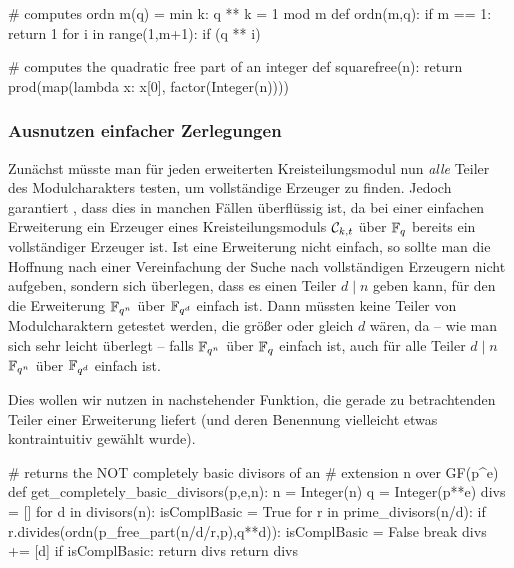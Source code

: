 \begin{sagecode}[caption={Aus \url{../Sage/enumeratePCNs.spyx}},
  firstnumber=538]
# computes ordn m(q) = min{ k: q ** k = 1 mod m }
def ordn(m,q):
    if m == 1: return 1
    for i in range(1,m+1):
        if (q ** i)%
\end{sagecode}  

\begin{sagecode}[caption={Aus \url{../Sage/enumeratePCNs.spyx}},
  firstnumber=534]
# computes the quadratic free part of an integer
def squarefree(n):
    return prod(map(lambda x: x[0], factor(Integer(n))))
\end{sagecode}  


\subsubsection{Ausnutzen einfacher Zerlegungen}

Zunächst müsste man für jeden erweiterten Kreisteilungsmodul
nun \emph{alle} Teiler des Modulcharakters testen, um vollständige Erzeuger zu
finden. Jedoch garantiert , dass dies in
manchen Fällen überflüssig ist, da bei einer einfachen Erweiterung ein Erzeuger
eines Kreisteilungsmoduls $\mathcal{C}_{k,t}$ über $\mathbb{F}_q$ bereits ein vollständiger
Erzeuger ist. Ist eine Erweiterung nicht einfach, so sollte man die Hoffnung
nach einer Vereinfachung der Suche nach vollständigen Erzeugern nicht aufgeben,
sondern sich überlegen, dass es einen Teiler $d \mid n$ geben kann, für den
die Erweiterung $\mathbb{F}_{q^n}$ über $\mathbb{F}_{q^d}$ einfach ist. Dann müssten keine
Teiler von Modulcharaktern getestet werden, die größer oder gleich $d$ wären, 
da -- wie man sich sehr leicht überlegt -- falls $\mathbb{F}_{q^n}$ über $\mathbb{F}_q$ einfach
ist, auch für alle Teiler $d\mid n$ $\mathbb{F}_{q^n}$ über $\mathbb{F}_{q^d}$ einfach ist.

Dies wollen wir nutzen in nachstehender Funktion, die
gerade zu betrachtenden Teiler einer Erweiterung liefert 
(und deren Benennung vielleicht etwas kontraintuitiv gewählt wurde).

\begin{sagecode}[caption={Aus \url{../Sage/enumeratePCNs.spyx}},
  firstnumber=594]
# returns the NOT completely basic divisors of an 
# extension n over GF(p^e)
def get_completely_basic_divisors(p,e,n):
    n = Integer(n)
    q = Integer(p**e)
    divs = []
    for d in divisors(n):
        isComplBasic = True
        for r in prime_divisors(n/d):
            if r.divides(ordn(p_free_part(n/d/r,p),q**d)):
                isComplBasic = False
                break
        divs += [d]
        if isComplBasic: return divs
    return divs
\end{sagecode}

